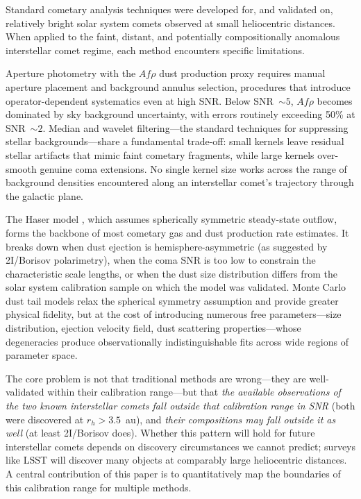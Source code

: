 \documentclass[usenatbib]{mnras}
\begin{document}
Standard cometary analysis techniques were developed for, and validated on, relatively bright solar system comets observed at small heliocentric distances. When applied to the faint, distant, and potentially compositionally anomalous interstellar comet regime, each method encounters specific limitations.

Aperture photometry with the $Af\rho$ dust production proxy \citep{lamy04,ahearn95} requires manual aperture placement and background annulus selection, procedures that introduce operator-dependent systematics even at high SNR. Below SNR~$\sim 5$, $Af\rho$ becomes dominated by sky background uncertainty, with errors routinely exceeding 50\% at SNR~$\sim 2$. Median and wavelet filtering---the standard techniques for suppressing stellar backgrounds---share a fundamental trade-off: small kernels leave residual stellar artifacts that mimic faint cometary fragments, while large kernels over-smooth genuine coma extensions. No single kernel size works across the range of background densities encountered along an interstellar comet's trajectory through the galactic plane.

The Haser model \citep{haser57}, which assumes spherically symmetric steady-state outflow, forms the backbone of most cometary gas and dust production rate estimates. It breaks down when dust ejection is hemisphere-asymmetric (as suggested by 2I/Borisov polarimetry), when the coma SNR is too low to constrain the characteristic scale lengths, or when the dust size distribution differs from the solar system calibration sample on which the model was validated. Monte Carlo dust tail models \citep{fulle10} relax the spherical symmetry assumption and provide greater physical fidelity, but at the cost of introducing numerous free parameters---size distribution, ejection velocity field, dust scattering properties---whose degeneracies produce observationally indistinguishable fits across wide regions of parameter space.

The core problem is not that traditional methods are wrong---they are well-validated within their calibration range---but that \textit{the available observations of the two known interstellar comets fall outside that calibration range in SNR} (both were discovered at $r_h > 3.5$~au), and \textit{their compositions may fall outside it as well} (at least 2I/Borisov does). Whether this pattern will hold for future interstellar comets depends on discovery circumstances we cannot predict; surveys like LSST will discover many objects at comparably large heliocentric distances. A central contribution of this paper is to quantitatively map the boundaries of this calibration range for multiple methods.
\end{document}
